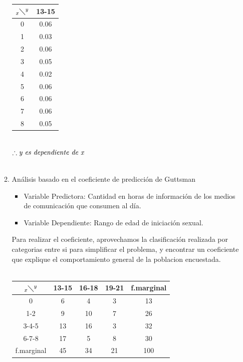 \documentclass[letterpaper,spanish,11pt]{article}
\begin{document}
\begin{itemize}
\begin{enumerate}
	\begin{tabular}[c]{|c|c|}
	\hline
	$_x\diagdown ^{y}$ & 13-15 \\
	\hline
	0 & 0.06 \\
	\hline
	1 & 0.03 \\
	\hline
	2 & 0.06 \\
	\hline
	3 & 0.05 \\
	\hline
	4 & 0.02 \\
	\hline
	5 & 0.06 \\
	\hline
	6 & 0.06 \\
	\hline
	7 & 0.06 \\
	\hline
	8 & 0.05\\
	\hline
	\end{tabular} \\

	$\therefore \emph{y es dependiente de x}$ \\ \\
\item An\'alisis basado en el coeficiente de predicci\'on de Guttsman\\

\begin{itemize}
	\item Variable Predictora: Cantidad en horas de informaci\'on de los medios de comunicaci\'on que consumen al d\'ia.\\ 
	\item Variable Dependiente: Rango de edad de iniciaci\'on sexual.\\
\end{itemize}

	Para realizar el coeficiente, aprovechamos la clasificaci\'on realizada por categorias entre si para simplificar el problema, y encontrar un coeficiente que explique el comportamiento general de la poblacion encuestada.\\\\
	
        \begin{tabular}[c]{|c|c c c|c|}
        \hline
        $_x\diagdown ^{y}$ & 13-15 & 16-18 & 19-21 & f.marginal \\
        \hline
        0 & 6 & 4 & 3 & 13 \\
        1-2 & 9 & 10 & 7 & 26 \\
        3-4-5 & 13 & 16 & 3 & 32 \\
        6-7-8 & 17 & 5 & 8 & 30\\
	\hline
        f.marginal & 45 & 34 & 21 & 100 \\
        \hline
        \end{tabular}\\\\


\end{enumerate}
\end{itemize}
\end{document}
